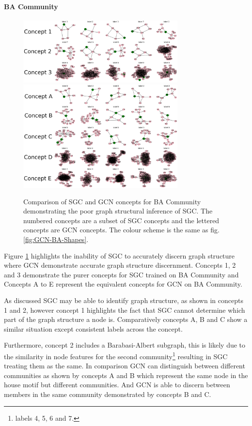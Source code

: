 \paragraph{BA Community}
\begin{figure}
    \centering
    \includegraphics[width=0.75\textwidth]{figures/SGC-BA-Community}
    \includegraphics[width=0.75\textwidth]{figures/GCN-BA-Community}
    \caption{Comparison of SGC and GCN concepts for BA Community demonstrating the poor graph structural inference of SGC. The numbered concepts are a subset of SGC concepts and the lettered concepts are GCN concepts. The colour scheme is the same as fig. \ref{fig:GCN-BA-Shapes}.}
    \label{fig:BA-Community}
\end{figure}

Figure \ref{fig:BA-Community} highlights the inability of SGC to accurately discern graph structure where GCN demonstrate accurate graph structure discernment.
Concepts 1, 2 and 3 demonstrate the purer concepts for SGC trained on BA Community and Concepts A to E represent the equivalent concepts for GCN on BA Community.

As discussed SGC may be able to identify graph structure, as shown in concepts 1 and 2, however concept 1 highlights the fact that SGC cannot determine which part of the graph structure a node is.
Comparatively concepts A, B and C show a similar situation except consistent labels across the concept.

Furthermore, concept 2 includes a Barabasi-Albert subgraph, this is likely due to the similarity in node features for the second community\footnote{labels 4, 5, 6 and 7.} resulting in SGC treating them as the same.
In comparison GCN can distinguish between different communities as shown by concepts A and B which represent the same node in the house motif but different communities.
And GCN is able to discern between members in the same community demonstrated by concepts B and C.

